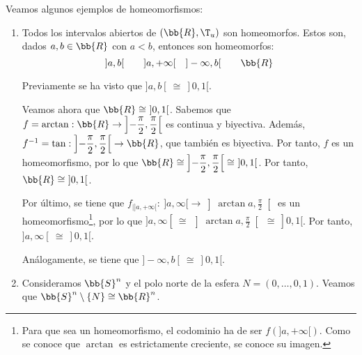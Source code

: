 \begin{ejemplo} Veamos algunos ejemplos de homeomorfismos:
    \begin{enumerate}
        \item Todos los intervalos abiertos de $(\bb{R},\T_u)$ son homeomorfos. Estos son, dados $a,b\in \bb{R}$ con $a<b$, entonces son homeomorfos:
        \begin{equation*}
            ]a,b[\qquad ]a,+\infty[ \quad ]-\infty, b[ \qquad \bb{R}
        \end{equation*}

        Previamente se ha visto que $]a,b[~ \cong~  ]0,1[$.

        Veamos ahora que $\bb{R}\cong~ ]0,1[$. Sabemos que $f=\arctan:\bb{R}\to \left]-\dfrac{\pi}{2},\dfrac{\pi}{2}\right[$ es continua y biyectiva. Además, $f^{-1}=\tan:\left]-\dfrac{\pi}{2},\dfrac{\pi}{2}\right[ \to \bb{R}$, que también es biyectiva. Por tanto, $f$ es un homeomorfismo, por lo que $\bb{R}\cong \left]-\dfrac{\pi}{2},\dfrac{\pi}{2}\right[\cong~]0,1[$. Por tanto, $\bb{R}\cong~]0,1[$.

        Por último, se tiene que $f_{\big|]a,+\infty[}:~]a,\infty[ \to \left]\arctan a, \frac{\pi}{2}\right[$ es un homeomorfismo\footnote{Para que sea un homeomorfismo, el codominio ha de ser $f(]a, +\infty[)$. Como se conoce que $\arctan$ es estrictamente creciente, se conoce su imagen.}, por lo que $]a,\infty[ ~\cong~ \left]\arctan a, \frac{\pi}{2}\right[~ \cong ~]0,1[$. Por tanto, $]a,\infty[~\cong~]0,1[$.

        Análogamente, se tiene que $]-\infty, b[~ \cong~]0,1[$.

        \item Consideramos $\bb{S}^n$ y el polo norte de la esfera $N=(0,\dots,0,1)$. Veamos que $\bb{S}^n\setminus \{N\}\cong \bb{R}^n$.


\end{enumerate}
\end{ejemplo}
